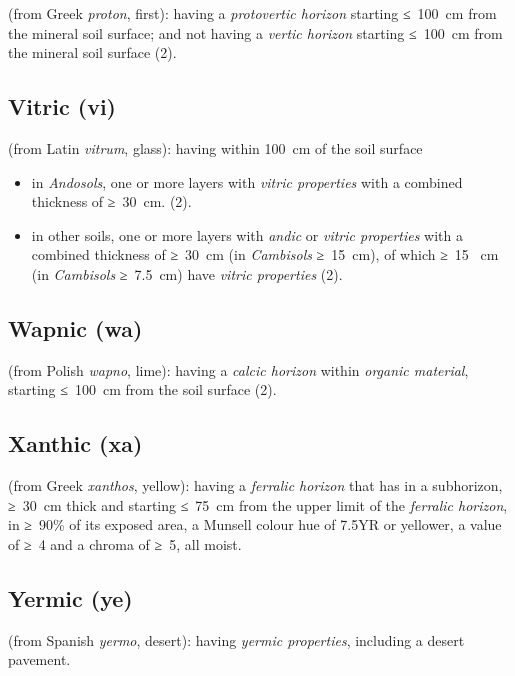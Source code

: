 \documentclass[
  letterpaper,
  DIV=11,
  numbers=noendperiod]{scrreprt}
\providecommand{\tightlist}{%
  \setlength{\itemsep}{0pt}\setlength{\parskip}{0pt}}\usepackage{longtable,booktabs,array}
\begin{document}
(from Greek \emph{proton}, first): having a \emph{protovertic horizon}
starting ≤~100~cm from the mineral soil surface; and not having a
\emph{vertic horizon} starting ≤~100~cm from the mineral soil surface
(2).

\hypertarget{vitric-vi}{%
\subsection{Vitric (vi)}\label{vitric-vi}}

(from Latin \emph{vitrum}, glass): having within 100~cm of the soil
surface

\begin{itemize}
\tightlist
\item
  in \emph{Andosols}, one or more layers with \emph{vitric properties}
  with a combined thickness of ≥~30~cm. (2).
\item
  in other soils, one or more layers with \emph{andic} or \emph{vitric
  properties} with a combined thickness of ≥~30~cm (in \emph{Cambisols}
  ≥~15~cm), of which ≥~15~ cm (in \emph{Cambisols} ≥~7.5~cm) have
  \emph{vitric properties} (2).
\end{itemize}

\hypertarget{wapnic-wa}{%
\subsection{Wapnic (wa)}\label{wapnic-wa}}

(from Polish \emph{wapno}, lime): having a \emph{calcic horizon} within
\emph{organic material}, starting ≤~100~cm from the soil surface (2).

\hypertarget{xanthic-xa}{%
\subsection{Xanthic (xa)}\label{xanthic-xa}}

(from Greek \emph{xanthos}, yellow): having a \emph{ferralic horizon}
that has in a subhorizon, ≥~30~cm thick and starting ≤~75~cm from the
upper limit of the \emph{ferralic horizon}, in ≥~90\% of its exposed
area, a Munsell colour hue of 7.5YR or yellower, a value of ≥~4 and a
chroma of ≥~5, all moist.

\hypertarget{yermic-ye}{%
\subsection{Yermic (ye)}\label{yermic-ye}}

(from Spanish \emph{yermo}, desert): having \emph{yermic properties},
including a desert pavement.
\end{document}
